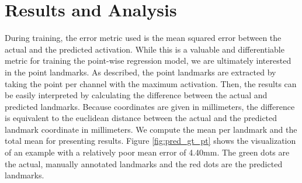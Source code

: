 \documentclass[class=article, crop=false]{standalone}
\begin{document}
\section{Results and Analysis}
\label{sec:results}
During training, the error metric used is the mean squared error between the actual and the predicted activation. While this is a valuable and differentiable metric for training the point-wise regression model, we are ultimately interested in the point landmarks. As described, the point landmarks are extracted by taking the point per channel with the maximum activation. Then, the results can be easily interpreted by calculating the difference between the actual and predicted landmarks. Because coordinates are given in millimeters, the difference is equivalent to the euclidean distance between the actual and the predicted landmark coordinate in millimeters. We compute the mean per landmark and the total mean for presenting results. Figure \ref{fig:pred_gt_pt} shows the visualization of an example with a relatively poor mean error of 4.40mm. The green dots are the actual, manually annotated landmarks and the red dots are the predicted landmarks.
\end{document}
